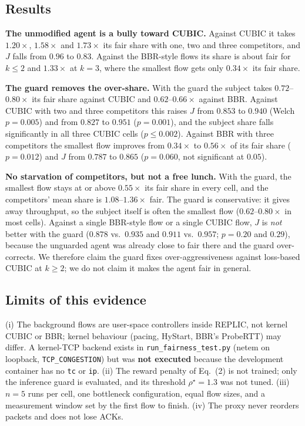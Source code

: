 \subsection{Results}
\textbf{The unmodified agent is a bully toward CUBIC.} Against CUBIC it takes $1.20\times$, $1.58\times$ and $1.73\times$ its fair share with one, two and three competitors, and $J$ falls from $0.96$ to $0.83$. Against the BBR-style flows its share is about fair for $k\le2$ and $1.33\times$ at $k=3$, where the smallest flow gets only $0.34\times$ its fair share.

\textbf{The guard removes the over-share.} With the guard the subject takes $0.72$--$0.80\times$ its fair share against CUBIC and $0.62$--$0.66\times$ against BBR. Against CUBIC with two and three competitors this raises $J$ from $0.853$ to $0.940$ (Welch $p=0.005$) and from $0.827$ to $0.951$ ($p=0.001$), and the subject share falls significantly in all three CUBIC cells ($p\le0.002$). Against BBR with three competitors the smallest flow improves from $0.34\times$ to $0.56\times$ of its fair share ($p=0.012$) and $J$ from $0.787$ to $0.865$ ($p=0.060$, not significant at $0.05$).

\textbf{No starvation of competitors, but not a free lunch.} With the guard, the smallest flow stays at or above $0.55\times$ its fair share in every cell, and the competitors' mean share is $1.08$--$1.36\times$ fair. The guard is conservative: it gives away throughput, so the subject itself is often the smallest flow ($0.62$--$0.80\times$ in most cells). Against a single BBR-style flow or a single CUBIC flow, $J$ is \emph{not} better with the guard ($0.878$ vs.\ $0.935$ and $0.911$ vs.\ $0.957$; $p=0.20$ and $0.29$), because the unguarded agent was already close to fair there and the guard over-corrects. We therefore claim the guard fixes over-aggressiveness against loss-based CUBIC at $k\ge2$; we do not claim it makes the agent fair in general.

\subsection{Limits of this evidence}
(i) The background flows are user-space controllers inside REPLIC, not kernel CUBIC or BBR; kernel behaviour (pacing, HyStart, BBR's ProbeRTT) may differ. A kernel-TCP backend exists in \texttt{run\_fairness\_test.py} (netem on loopback, \texttt{TCP\_CONGESTION}) but was \textbf{not executed} because the development container has no \texttt{tc} or \texttt{ip}. (ii) The reward penalty of Eq.~(2) is not trained; only the inference guard is evaluated, and its threshold $\rho^\star=1.3$ was not tuned. (iii) $n=5$ runs per cell, one bottleneck configuration, equal flow sizes, and a measurement window set by the first flow to finish. (iv) The proxy never reorders packets and does not lose ACKs.
